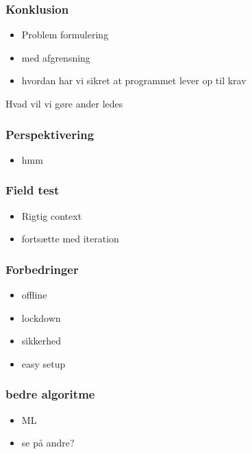 \begin{frame}
	\frametitle{Konklusion}
	\begin{itemize}
		\item Problem formulering
		\item med afgrensning
		\item hvordan har vi sikret at programmet lever op til krav
	\end{itemize}
\end{frame}

Hvad vil vi gøre ander ledes
\begin{frame}
	\frametitle{Perspektivering}
	\begin{itemize}
		\item hmm
	\end{itemize}
\end{frame}

\begin{frame}
	\frametitle{Field test}
	\begin{itemize}
		\item Rigtig context
		\item fortsætte med iteration
	\end{itemize}
\end{frame}

\begin{frame}
	\frametitle{Forbedringer}
	\begin{itemize}
		\item offline
		\item lockdown
		\item sikkerhed
		\item easy setup
	\end{itemize}
\end{frame}



\begin{frame}
	\frametitle{bedre algoritme}
	\begin{itemize}
		\item ML
		\item se på andre?
	\end{itemize}
\end{frame}